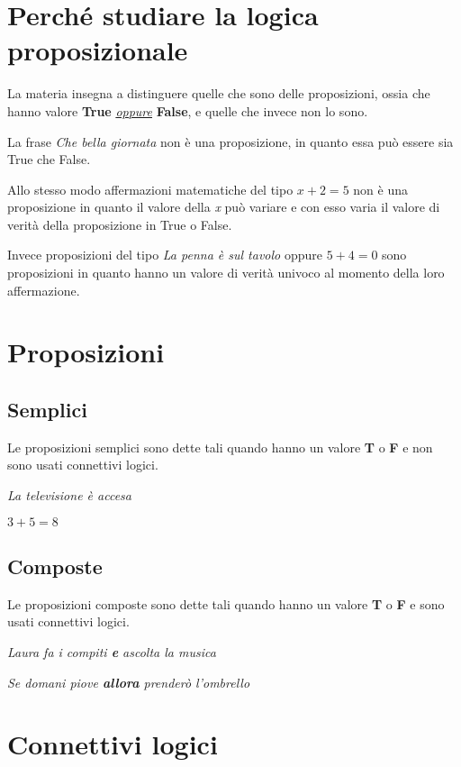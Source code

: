 \section{Perché studiare la logica proposizionale}
La materia insegna a distinguere quelle che sono delle proposizioni, ossia che hanno valore \textbf{True} \underline{\textit{oppure}} \textbf{False}, e quelle che invece non lo sono.

La frase \emph{Che bella giornata} non è una proposizione, in quanto essa può essere sia True che False.

Allo stesso modo affermazioni matematiche del tipo $x + 2 = 5$ non è una proposizione in quanto il valore della \textit{x} può variare e con esso varia il valore di verità della proposizione in True o False.

Invece proposizioni del tipo \emph{La penna è sul tavolo} oppure $5 + 4 = 0$ sono proposizioni in quanto hanno un valore di verità univoco al momento della loro affermazione.

\section{Proposizioni}
\subsection{Semplici}
Le proposizioni semplici sono dette tali quando hanno un valore \textbf{T} o \textbf{F} e non sono usati connettivi logici.
\begin{example}
\emph{La televisione è accesa}
\end{example}
\begin{example}
$3 + 5 = 8$
\end{example}

\subsection{Composte}
Le proposizioni composte sono dette tali quando hanno un valore \textbf{T} o \textbf{F} e sono usati connettivi logici.
\begin{example}
\emph{Laura fa i compiti \textbf{e} ascolta la musica}
\end{example}
\begin{example}
\emph{Se domani piove \textbf{allora} prenderò l'ombrello}
\end{example}

\section{Connettivi logici}

